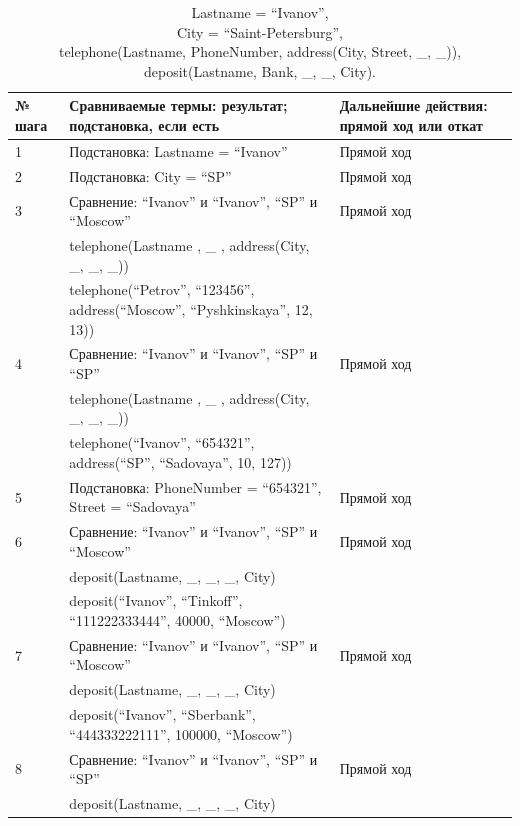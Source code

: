 {
\small
\begin{longtable}{|p{1.15cm}|p{8cm}|p{8cm}|}
    \caption{
        Lastname = ``Ivanov'', \\
        City = ``Saint-Petersburg'',\\
        telephone(Lastname, PhoneNumber, address(City, Street, \_, \_)),\\
        deposit(Lastname, Bank, \_, \_, City).
    } \\
    \hline
    № шага & Сравниваемые термы: результат; подстановка, если есть & Дальнейшие действия: прямой ход или откат \\
    \hline
    1 & Подстановка: Lastname = ``Ivanov'' & Прямой ход \\
    \hline
    2 & Подстановка: City = ``SP'' & Прямой ход \\
    \hline
    3 & Сравнение: ``Ivanov'' и ``Ivanov'', ``SP'' и ``Moscow'' & Прямой ход \\
      & telephone(Lastname , \_ , address(City, \_, \_, \_)) & \\
      & telephone(``Petrov'', ``123456'', address(``Moscow'', ``Pyshkinskaya'', 12, 13)) & \\
    \hline
    4 & Сравнение: ``Ivanov'' и ``Ivanov'', ``SP'' и ``SP'' & Прямой ход \\
      & telephone(Lastname , \_ , address(City, \_, \_, \_)) & \\
      & telephone(``Ivanov'', ``654321'', address(``SP'', ``Sadovaya'', 10, 127)) & \\
    \hline
    5 & Подстановка: PhoneNumber = ``654321'', Street = ``Sadovaya'' & Прямой ход \\
    \hline
    6 & Сравнение: ``Ivanov'' и ``Ivanov'', ``SP'' и ``Moscow'' & Прямой ход \\
      & deposit(Lastname, \_, \_, \_, City) & \\
      & deposit(``Ivanov'', ``Tinkoff'', ``111222333444'', 40000, ``Moscow'') & \\
    \hline
    7 & Сравнение: ``Ivanov'' и ``Ivanov'', ``SP'' и ``Moscow'' & Прямой ход \\
      & deposit(Lastname, \_, \_, \_, City) & \\
      & deposit(``Ivanov'', ``Sberbank'', ``444333222111'', 100000, ``Moscow'') & \\
    \hline
    8 & Сравнение: ``Ivanov'' и ``Ivanov'', ``SP'' и ``SP'' & Прямой ход \\
      & deposit(Lastname, \_, \_, \_, City) & \\

\end{longtable}}
